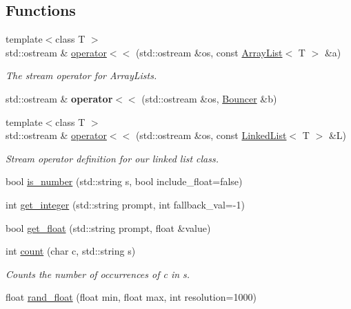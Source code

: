 \subsection*{Functions}
\begin{DoxyCompactItemize}
\item 
\mbox{\label{namespacessuds_aaa385f1fa04071f6b537c74e65b6beea}} 
{\footnotesize template$<$class T $>$ }\\std\+::ostream \& \mbox{\hyperlink{namespacessuds_aaa385f1fa04071f6b537c74e65b6beea}{operator$<$$<$}} (std\+::ostream \&os, const \mbox{\hyperlink{classssuds_1_1_array_list}{Array\+List}}$<$ T $>$ \&a)
\begin{DoxyCompactList}\small\item\em The stream operator for Array\+Lists. \end{DoxyCompactList}\item 
\mbox{\label{namespacessuds_ad5e0828821773f33da80209553f10e2f}} 
std\+::ostream \& {\bfseries operator$<$$<$} (std\+::ostream \&os, \mbox{\hyperlink{classssuds_1_1_bouncer}{Bouncer}} \&b)
\item 
\mbox{\label{namespacessuds_ad5bd0a2e9d2f90f31b0782584184d3db}} 
{\footnotesize template$<$class T $>$ }\\std\+::ostream \& \mbox{\hyperlink{namespacessuds_ad5bd0a2e9d2f90f31b0782584184d3db}{operator$<$$<$}} (std\+::ostream \&os, const \mbox{\hyperlink{classssuds_1_1_linked_list}{Linked\+List}}$<$ T $>$ \&L)
\begin{DoxyCompactList}\small\item\em Stream operator definition for our linked list class. \end{DoxyCompactList}\item 
bool \mbox{\hyperlink{namespacessuds_a636fd424d2a3e918dc8e8e367eb3ae34}{is\+\_\+number}} (std\+::string s, bool include\+\_\+float=false)
\item 
int \mbox{\hyperlink{namespacessuds_a3146bc135f96f478eef61482cfe60738}{get\+\_\+integer}} (std\+::string prompt, int fallback\+\_\+val=-\/1)
\item 
bool \mbox{\hyperlink{namespacessuds_a0edcd5330a83846b934e542639e1d7a6}{get\+\_\+float}} (std\+::string prompt, float \&value)
\item 
\mbox{\label{namespacessuds_a9a3ed092ad50d809cf227f25d1295e3d}} 
int \mbox{\hyperlink{namespacessuds_a9a3ed092ad50d809cf227f25d1295e3d}{count}} (char c, std\+::string s)
\begin{DoxyCompactList}\small\item\em Counts the number of occurrences of c in s. \end{DoxyCompactList}\item 
float \mbox{\hyperlink{namespacessuds_a0997aebd2d382353fa6622a2bade3925}{rand\+\_\+float}} (float min, float max, int resolution=1000)
\end{DoxyCompactItemize}


